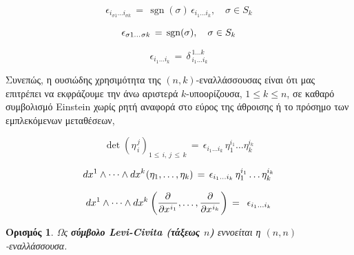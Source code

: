 \documentclass[11pt,a4paper,twoside,openright]{book}
\newtheorem{definition}[lemma]{Ορισμός}
\begin{document}
\begin{equation}\label{eq:alternator-antisymmetry}
\epsilon_{i_{\sigma 1} \dots i_{\sigma k}}
\,
=
\,
\operatorname{sgn}(\sigma) \, \epsilon_{i_1 \dots i_k},
\quad
\sigma \in S_k
\end{equation}

\begin{equation}\label{eq:alternator-permutation}
\epsilon_{\sigma 1 \dots \hspace{.5pt}\sigma k}
\,
=
\,
\operatorname{sgn}(\sigma),
\quad
\sigma \in S_k
\end{equation}

\begin{equation}\label{eq:alternator-kronecker}
\epsilon_{i_1 \dots i_k}
\,
=
\,
\delta^{\,1 \dots k}_{\,i_1 \dots i_k}
\end{equation}

\noindent
Συνεπώς, η ουσιώδης χρησιμότητα της $(n,k)$-εναλλάσσουσας
είναι ότι μας επιτρέπει να εκφράζουμε την άνω αριστερά $k$-υποορίζουσα, $1 \le k \le n$, σε καθαρό συμβολισμό Einstein χωρίς ρητή αναφορά στο εύρος της άθροισης ή το πρόσημο των εμπλεκόμενων μεταθέσεων,

\begin{equation}\label{eq:alternator-essential}
\det \left(\eta_{\,i}^{\,j}\right)_{1 \le\, i,\,j\, \le \, k}
\,
=
\,
\epsilon_{i_1 \dots i_k}\,\eta_1^{i_1} \dots \eta_k^{i_k}
\end{equation}

\begin{equation}\label{eq:alternator-expansion}
dx^1 \wedge \dots \wedge dx^k \hspace{.5pt}
(\eta_1, \dots, \eta_k)
\,
=
\,
\epsilon_{i_1 \dots i_k}\,\eta_1^{i_1} \dots \eta_k^{i_k}
\end{equation}

\begin{equation}\label{eq:alternator-expansion-elementary}
dx^1 \wedge \dots \wedge dx^k \hspace{.5pt}
\left(\frac{\partial}{\partial x^{\hspace{.5pt}i_1}}, \dots, \frac{\partial}{\partial x^{\hspace{.5pt}i_k}}\right)
\,
=
\,
\,\,\epsilon_{i_1 \dots i_k}
\end{equation}

\begin{definition}\label{def:levi-civita-symbol}
Ως \textbf{σύμβολο Levi-Civita (τάξεως $n$)} εννοείται η $(n, n)$-εναλλάσσουσα.
\end{definition}
\end{document}
